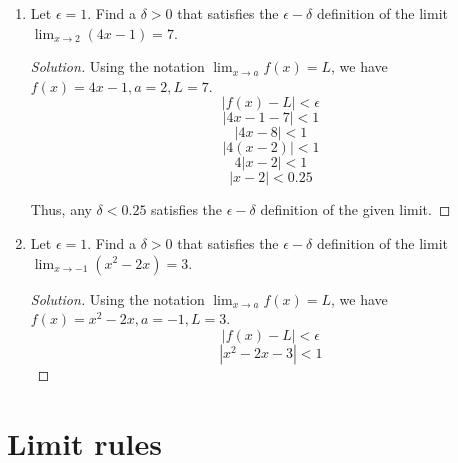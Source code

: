 \documentclass[12pt]{article}
\newenvironment{solution}{\begin{proof}[Solution]}{\end{proof}}
\begin{document}
\begin{enumerate}
		\item Let $\epsilon=1$. Find a $\delta>0$ that satisfies the $\epsilon-\delta$ definition of the limit $\displaystyle{\lim_{x\to2} (4x-1)}=7$.
		\begin{solution}
			Using the notation $\displaystyle{\lim_{x \to a} f(x)}=L$, we have $f(x)=4x-1,a=2,L=7$.
			$$|f(x)-L|<\epsilon$$
			$$|4x-1-7|<1$$
			$$|4x-8|<1$$
			$$|4(x-2)|<1$$
			$$4|x-2|<1$$
			$$|x-2|<0.25$$
			
			Thus, any $\delta <0.25$ satisfies the $\epsilon-\delta$ definition of the given limit.
		\end{solution}
		
		\item Let $\epsilon=1$. Find a $\delta>0$ that satisfies the $\epsilon-\delta$ definition of the limit $\displaystyle{\lim_{x\to-1} (x^2-2x)}=3$.
		\begin{solution}
			Using the notation $\displaystyle{\lim_{x \to a} f(x)}=L$, we have $f(x)=x^2-2x,a=-1,L=3$.
			$$|f(x)-L|<\epsilon$$
			$$|x^2-2x-3|<1$$
		\end{solution}
	\end{enumerate}
	\section{Limit rules}
	
\end{document}
